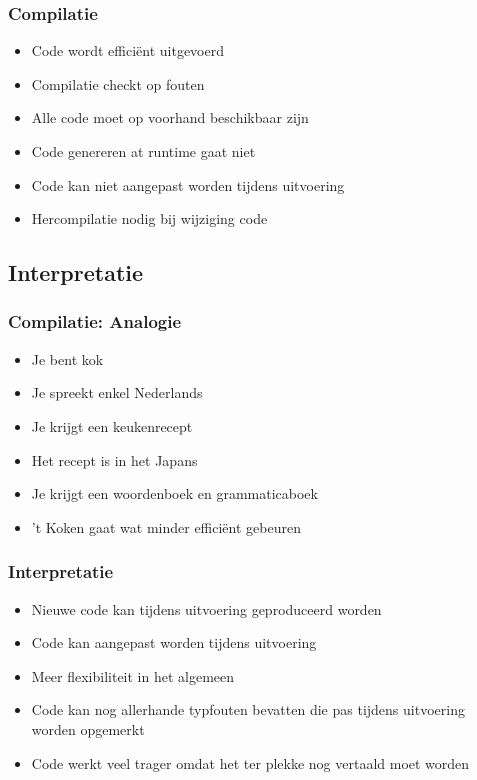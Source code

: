 \begin{frame}
  \frametitle{Compilatie}
  \begin{itemize}
    \item Code wordt effici\"ent uitgevoerd
    \item Compilatie checkt op fouten
  \end{itemize}
  \vskip5mm
  \begin{itemize}
    \item Alle code moet op voorhand beschikbaar zijn
    \item Code genereren at runtime gaat niet
    \item Code kan niet aangepast worden tijdens uitvoering
    \item Hercompilatie nodig bij wijziging code
  \end{itemize}
\end{frame}

\subsection{Interpretatie}

\frame{\tableofcontents[currentsubsection]}

\begin{frame}
  \frametitle{Compilatie: Analogie}
  \begin{itemize}
    \item Je bent kok
    \item Je spreekt enkel Nederlands
    \item Je krijgt een keukenrecept
    \item Het recept is in het Japans
    \item Je krijgt een woordenboek en grammaticaboek
    \item 't Koken gaat wat minder effici\"ent gebeuren
  \end{itemize}
\end{frame}

\begin{frame}
  \frametitle{Interpretatie}
  \begin{itemize}
    \item Nieuwe code kan tijdens uitvoering geproduceerd worden
    \item Code kan aangepast worden tijdens uitvoering
    \item Meer flexibiliteit in het algemeen
  \end{itemize}
  \vskip5mm
  \begin{itemize}
    \item Code kan nog allerhande typfouten bevatten die pas tijdens uitvoering worden opgemerkt
    \item Code werkt veel trager omdat het ter plekke nog vertaald moet worden
  \end{itemize}
\end{frame}

